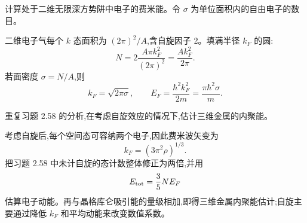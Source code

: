 \begin{question}
计算处于二维无限深方势阱中电子的费米能。令 $\sigma$ 为单位面积内的自由电子的数目。
\begin{solution}

二维电子气每个 $k$ 态面积为 $(2\pi)^2/A$,含自旋因子 2。填满半径 $k_F$ 的圆:
\[
N=2\frac{A\pi k_F^2}{(2\pi)^2}=\frac{A k_F^2}{2\pi}.
\]
若面密度 $\sigma=N/A$,则
\[
k_F=\sqrt{2\pi\sigma},
\qquad
E_F=\frac{\hbar^2k_F^2}{2m}=\frac{\pi\hbar^2\sigma}{m}.
\]

\end{solution}
\end{question}

\begin{question}
重复习题 2.58 的分析,在考虑自旋效应的情况下,估计三维金属的内聚能。
\begin{solution}

考虑自旋后,每个空间态可容纳两个电子,因此费米波矢变为
\[
k_F=(3\pi^2\rho)^{1/3}.
\]
把习题 2.58 中未计自旋的态计数整体修正为两倍,并用
\[
E_{\rm tot}=\frac35NE_F
\]
估算电子动能。再与晶格库仑吸引能的量级相加,即得三维金属内聚能估计;自旋主要通过降低 $k_F$ 和平均动能来改变数值系数。

\end{solution}
\end{question}

